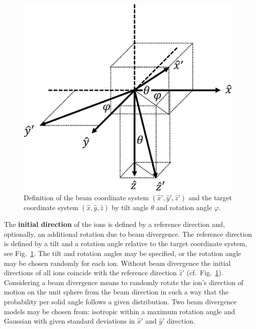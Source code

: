 \begin{figure}[htbp]
\centering
\noindent\includegraphics[scale=1.0]{coordinate_systems-crop.pdf}
\caption{Definition of the beam coordinate system $(\hat{x}', \hat{y}',
\hat{z}')$ and the target coordinate system $(\hat{x}, \hat{y}, \hat{z})$ by
tilt angle $\theta$ and rotation angle $\varphi$.}
\label{fig:coord}
\end{figure}   
%
The \textbf{initial direction} of the ions is defined by a reference direction
and, optionally, an additional rotation due to beam  divergence.
The reference direction is defined by a tilt and a rotation angle relative to
the target coordinate system, see Fig.~\ref{fig:coord}. The tilt and rotation
angles may be specified, or the rotation angle may be chosen randomly for each
ion. Without beam divergence the initial directions of all ions coincide with
the reference direction $\hat{z}'$ (cf.\ Fig.~\ref{fig:coord}). Considering a
beam divergence means to randomly rotate the ion’s direction of motion on the
unit sphere from the beam direction in such a way that the probability per solid
angle follows a given distribution. Two beam divergence models may be chosen from:
isotropic within a maximum rotation angle and Gaussian with given standard
deviations in $\hat{x}'$ and $\hat{y}'$ direction.

